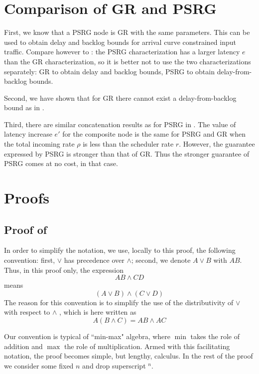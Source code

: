 \section{Comparison of GR and PSRG} 
First, we know that a PSRG node is GR with the same
parameters. This can be used to obtain delay and backlog
bounds for arrival curve constrained input traffic. Compare
however  to : the PSRG
characterization has a larger latency $e$ than the GR
characterization, so it is better not to use the two
characterizations separately: GR to obtain delay and backlog
bounds, PSRG to obtain delay-from-backlog bounds.

Second, we have shown  that for GR there cannot exist a
delay-from-backlog bound as in .

Third, there are similar concatenation results as for PSRG in
. The value of latency increase $e'$ for
the composite node is the same for PSRG and GR when the total
incoming rate $\rho$ is less than the scheduler rate $r$.
However, the guarantee expressed by PSRG is stronger than that
of GR. Thus the stronger guarantee of PSRG comes at no cost,
in that case.


%
\section{Proofs} 

\subsection{Proof of } In order to
simplify the notation, we use, locally to this proof, the
 following convention: first, $\vee$ has precedence over $\wedge$; second, we denote $A \vee B$ with
 $A B$. Thus, in this proof only, the expression
 $$
 A  B \wedge C D
 $$ means
  $$
 (A \vee B) \wedge (C \vee D)
 $$
 The reason for this convention is to simplify the use of the distributivity
 of $\vee$ with respect to $\wedge$ \cite{maxPlus}, which
 is here written as
 $$
 A ( B \wedge C) = A B \wedge A C
 $$

Our convention is typical of ``min-max" algebra, where $\min$
takes the role of addition and $\max$ the role of
multiplication. Armed with this facilitating notation, the
proof becomes simple, but lengthy, calculus. In the rest of
the proof we consider some fixed $n$ and drop superscript
$^n$.

